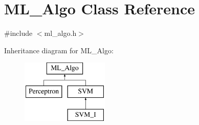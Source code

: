 \hypertarget{classML__Algo}{}\section{M\+L\+\_\+\+Algo Class Reference}
\label{classML__Algo}


{\ttfamily \#include $<$ml\+\_\+algo.\+h$>$}

Inheritance diagram for M\+L\+\_\+\+Algo\+:\begin{figure}[H]
\begin{center}
\leavevmode
\includegraphics[height=3.000000cm]{classML__Algo}
\end{center}
\end{figure}
